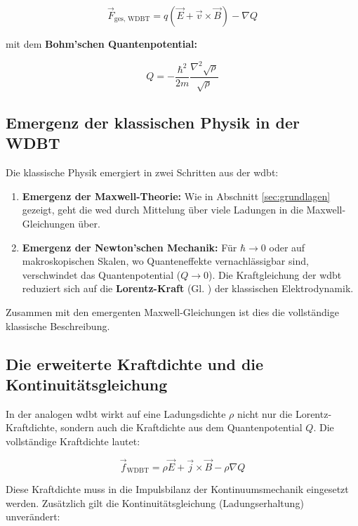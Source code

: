 \begin{equation}
    \vec{F}_{\text{ges, WDBT}} = q(\vec{E} + \vec{v} \times \vec{B}) - \nabla Q
\end{equation}

mit dem \textbf{Bohm'schen Quantenpotential:}

\begin{equation}
    Q = -\frac{\hbar^2}{2m} \frac{\nabla^2 \sqrt{\rho}}{\sqrt{\rho}}
\end{equation}

\subsection{Emergenz der klassischen Physik in der WDBT}
Die klassische Physik emergiert in zwei Schritten aus der \gls{wdbt}:

\begin{enumerate}
    \item \textbf{Emergenz der Maxwell-Theorie:} Wie in Abschnitt \ref{sec:grundlagen} gezeigt, geht die \gls{wed} durch Mittelung über viele Ladungen in die Maxwell-Gleichungen über.
    \item \textbf{Emergenz der Newton'schen Mechanik:} Für $\hbar \to 0$ oder auf makroskopischen Skalen, wo Quanteneffekte vernachlässigbar sind, verschwindet das Quantenpotential ($Q \to 0$). Die Kraftgleichung der \gls{wdbt} reduziert sich auf die \textbf{Lorentz-Kraft} (Gl. ) der klassischen Elektrodynamik.
\end{enumerate}

Zusammen mit den emergenten Maxwell-Gleichungen ist dies die vollständige klassische Beschreibung.

\subsection{Die erweiterte Kraftdichte und die Kontinuitätsgleichung}
In der analogen \gls{wdbt} wirkt auf eine Ladungsdichte $\rho$ nicht nur die Lorentz-Kraftdichte, sondern auch die Kraftdichte aus dem Quantenpotential $Q$. Die vollständige Kraftdichte lautet:

\begin{equation}
    \vec{f}_{\text{WDBT}} = \rho \vec{E} + \vec{j} \times \vec{B} - \rho \nabla Q
\end{equation}

Diese Kraftdichte muss in die Impulsbilanz der Kontinuumsmechanik eingesetzt werden. Zusätzlich gilt die Kontinuitätsgleichung (Ladungserhaltung) unverändert:


